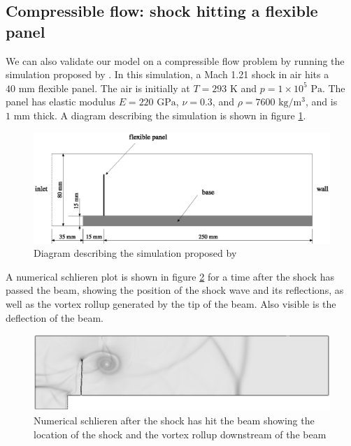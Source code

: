 \documentclass{article}
\begin{document}
\subsection{Compressible flow: shock hitting a flexible panel}
We can also validate our model on a compressible flow problem by running the simulation proposed by \cite{Giordano2005}.
In this simulation, a Mach 1.21 shock in air hits a $40 \mbox{ mm}$ flexible panel.  
The air is initially at $T = 293 \mbox{ K}$ and $p = 1 \times 10^5 \mbox { Pa}$.
The panel has elastic modulus $E = 220 \mbox{ GPa}$, $\nu = 0.3$, and $\rho = 7600 \mbox{ kg/m$^3$}$, and is $1 \mbox{ mm}$ thick.
A diagram describing the simulation is shown in figure \ref{fig:BeamInChannelDiagram}.
\begin{figure}[ht]
        \centering
        \includegraphics[width=\textwidth]{beam_in_channel_diagram} 
        \caption{Diagram describing the simulation proposed by \cite{Giordano2005}}
        \label{fig:BeamInChannelDiagram}
\end{figure}
A numerical schlieren plot is shown in figure \ref{fig:BeamInChannelSchlieren} for a time after the shock has passed the beam, showing the position of the shock wave and its reflections, as well as the vortex rollup generated by the tip of the beam.
Also visible is the deflection of the beam.
\begin{figure}[ht]
        \centering
        \includegraphics[width=\textwidth]{schlieren} 
        \caption{Numerical schlieren after the shock has hit the beam showing the location of the shock and the vortex rollup downstream of the beam}
        \label{fig:BeamInChannelSchlieren}
\end{figure}
\end{document}
